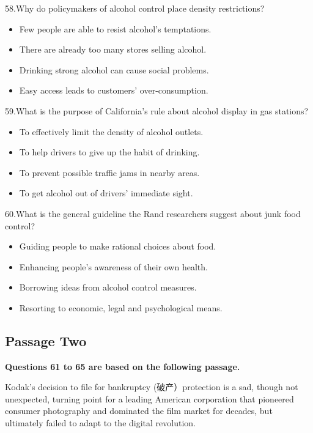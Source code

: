 \documentclass[UTF8,11pt]{ctexart}
\begin{document}
58.Why do policymakers of alcohol control place density restrictions?


\begin{itemize}[leftmargin=2em,itemsep=.2em,topsep=.4em]\item[A.] Few people are able to resist alcohol’s temptations.
\item[B.] There are already too many stores selling alcohol.
\item[C.] Drinking strong alcohol can cause social problems.
\item[D.] Easy access leads to customers’ over-consumption.
\end{itemize}

59.What is the purpose of California’s rule about alcohol display in gas stations?


\begin{itemize}[leftmargin=2em,itemsep=.2em,topsep=.4em]\item[A.] To effectively limit the density of alcohol outlets.
\item[B.] To help drivers to give up the habit of drinking.
\item[C.] To prevent possible traffic jams in nearby areas.
\item[D.] To get alcohol out of drivers’ immediate sight.
\end{itemize}

60.What is the general guideline the Rand researchers suggest about junk food control?


\begin{itemize}[leftmargin=2em,itemsep=.2em,topsep=.4em]\item[A.] Guiding people to make rational choices about food.
\item[B.] Enhancing people’s awareness of their own health.
\item[C.] Borrowing ideas from alcohol control measures.
\item[D.] Resorting to economic, legal and psychological means.
\end{itemize}

\subsection*{\textbf{Passage Two}}


\textbf{Questions 61 to 65 are based on the following passage.}


Kodak’s decision to file for bankruptcy (破产）protection is a sad, though not unexpected, turning point for a leading American corporation that pioneered consumer photography and dominated the film market for decades, but ultimately failed to adapt to the digital revolution.
\end{document}
